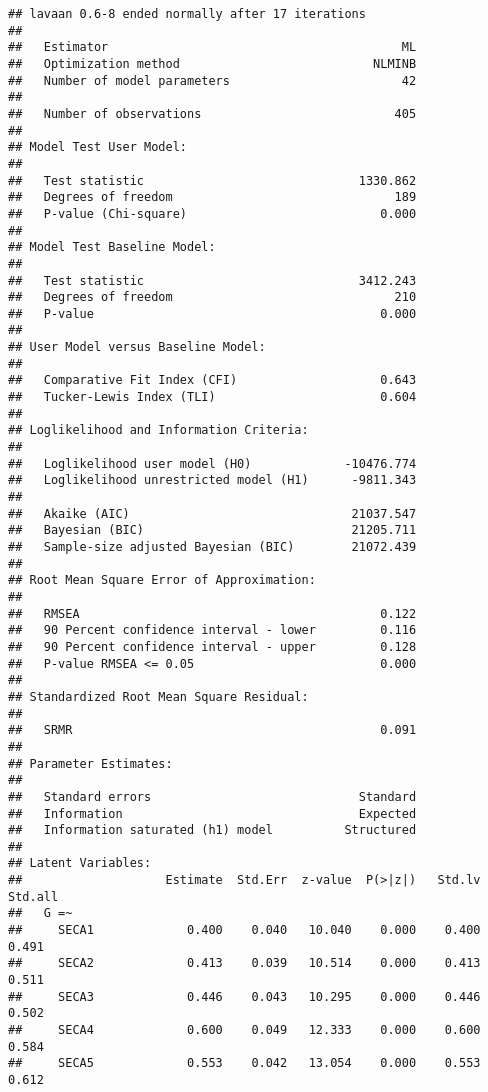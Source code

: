 \documentclass[
]{article}
\begin{document}
\begin{verbatim}
## lavaan 0.6-8 ended normally after 17 iterations
## 
##   Estimator                                         ML
##   Optimization method                           NLMINB
##   Number of model parameters                        42
##                                                       
##   Number of observations                           405
##                                                       
## Model Test User Model:
##                                                       
##   Test statistic                              1330.862
##   Degrees of freedom                               189
##   P-value (Chi-square)                           0.000
## 
## Model Test Baseline Model:
## 
##   Test statistic                              3412.243
##   Degrees of freedom                               210
##   P-value                                        0.000
## 
## User Model versus Baseline Model:
## 
##   Comparative Fit Index (CFI)                    0.643
##   Tucker-Lewis Index (TLI)                       0.604
## 
## Loglikelihood and Information Criteria:
## 
##   Loglikelihood user model (H0)             -10476.774
##   Loglikelihood unrestricted model (H1)      -9811.343
##                                                       
##   Akaike (AIC)                               21037.547
##   Bayesian (BIC)                             21205.711
##   Sample-size adjusted Bayesian (BIC)        21072.439
## 
## Root Mean Square Error of Approximation:
## 
##   RMSEA                                          0.122
##   90 Percent confidence interval - lower         0.116
##   90 Percent confidence interval - upper         0.128
##   P-value RMSEA <= 0.05                          0.000
## 
## Standardized Root Mean Square Residual:
## 
##   SRMR                                           0.091
## 
## Parameter Estimates:
## 
##   Standard errors                             Standard
##   Information                                 Expected
##   Information saturated (h1) model          Structured
## 
## Latent Variables:
##                    Estimate  Std.Err  z-value  P(>|z|)   Std.lv  Std.all
##   G =~                                                                  
##     SECA1             0.400    0.040   10.040    0.000    0.400    0.491
##     SECA2             0.413    0.039   10.514    0.000    0.413    0.511
##     SECA3             0.446    0.043   10.295    0.000    0.446    0.502
##     SECA4             0.600    0.049   12.333    0.000    0.600    0.584
##     SECA5             0.553    0.042   13.054    0.000    0.553    0.612

\end{verbatim}
\end{document}

